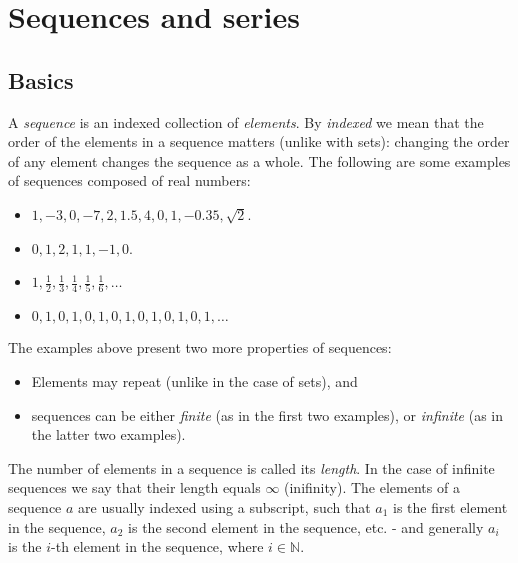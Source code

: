 \section{Sequences and series}
\subsection{Basics}
A \emph{sequence} is an indexed collection of \emph{elements}. By \textit{indexed} we mean that the order of the elements in a sequence matters (unlike with sets): changing the order of any element changes the sequence as a whole. The following are some examples of sequences composed of real numbers:
\begin{itemize}
	\item $1,-3,0,-7,2,1.5,4,0,1,-0.35,\sqrt{2}$.
	\item $0,1,2,1,1,-1,0$.
	\item $1, \frac{1}{2}, \frac{1}{3}, \frac{1}{4}, \frac{1}{5}, \frac{1}{6}, \dots$
	\item $0,1,0,1,0,1,0,1,0,1,0,1,0,1,\dots$
\end{itemize}
The examples above present two more properties of sequences:
\begin{itemize}
	\item Elements may repeat (unlike in the case of sets), and
	\item sequences can be either \emph{finite} (as in the first two examples), or \emph{infinite} (as in the latter two examples).
\end{itemize}

The number of elements in a sequence is called its \emph{length}. In the case of infinite sequences we say that their length equals $\infty$ (inifinity). The elements of a sequence $a$ are usually indexed using a subscript, such that $a_{1}$ is the first element in the sequence, $a_{2}$ is the second element in the sequence, etc. - and generally $a_{i}$ is the $i$-th element in the sequence, where $i\in\mathbb{N}$.

